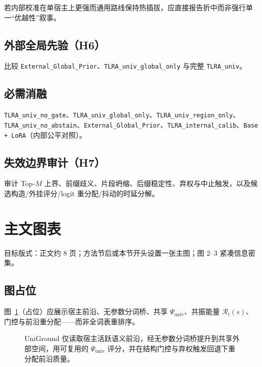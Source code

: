 若内部校准在单宿主上更强而通用路线保持热插拔，应直接报告折中而非强行单一“优越性”叙事。

\subsection{外部全局先验（H6）}

比较 \texttt{External\_Global\_Prior}、\texttt{TLRA\_univ\_global\_only} 与完整 \texttt{TLRA\_univ}。

\subsection{必需消融}

\texttt{TLRA\_univ\_no\_gate}、\texttt{TLRA\_univ\_global\_only}、\texttt{TLRA\_univ\_region\_only}、\texttt{TLRA\_univ\_no\_abstain}、\texttt{External\_Global\_Prior}、\texttt{TLRA\_internal\_calib}、\texttt{Base + LoRA}（内部公平对照）。

\subsection{失效边界审计（H7）}

审计 Top-$M$ 上界、前缀歧义、片段坍缩、后缀稳定性、弃权与中止触发，以及候选构造/外挂评分/logit 重分配/抖动的时延分解。

\section{主文图表}
\label{sec:tables}

目标版式：正文约 8 页；方法节后或本节开头设置一张主图；图 2--3 紧凑信息密集。

\subsection{图占位}

图~\ref{fig:hero}（占位）应展示宿主前沿、无参数分词桥、共享 $\Psi_{\mathrm{univ}}$、共振能量 $\mathcal{R}_t(s)$、门控与前沿重分配——而非全词表重排序。

\begin{figure}[t]
  \centering
  \caption{UniGround 仅读取宿主活跃语义前沿，经无参数分词桥提升到共享外部空间，用可复用的 $\Psi_{\mathrm{univ}}$ 评分，并在结构门控与弃权触发回退下重分配前沿质量。}
  \label{fig:hero}
\end{figure}

